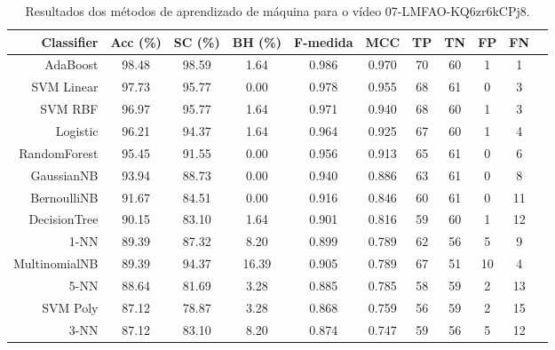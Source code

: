 \begin{table}[!htb]
\centering
\caption{Resultados dos métodos de aprendizado de máquina para o vídeo 07-LMFAO-KQ6zr6kCPj8.}
\label{tab:07-LMFAO-KQ6zr6kCPj8}
\begin{tabular}{r|c|c|c|c|c|c|c|c|c|c}
\hline\hline
Classifier & Acc (\%) & SC (\%) & BH (\%) & F-medida & MCC & TP & TN & FP & FN \\ \hline
AdaBoost & 98.48 & 98.59 & 1.64 & 0.986 & 0.970 & 70 & 60 & 1 & 1 \\ 
SVM Linear & 97.73 & 95.77 & 0.00 & 0.978 & 0.955 & 68 & 61 & 0 & 3 \\ 
SVM RBF & 96.97 & 95.77 & 1.64 & 0.971 & 0.940 & 68 & 60 & 1 & 3 \\ 
Logistic & 96.21 & 94.37 & 1.64 & 0.964 & 0.925 & 67 & 60 & 1 & 4 \\ 
RandomForest & 95.45 & 91.55 & 0.00 & 0.956 & 0.913 & 65 & 61 & 0 & 6 \\ 
GaussianNB & 93.94 & 88.73 & 0.00 & 0.940 & 0.886 & 63 & 61 & 0 & 8 \\ 
BernoulliNB & 91.67 & 84.51 & 0.00 & 0.916 & 0.846 & 60 & 61 & 0 & 11 \\ 
DecisionTree & 90.15 & 83.10 & 1.64 & 0.901 & 0.816 & 59 & 60 & 1 & 12 \\ 
1-NN & 89.39 & 87.32 & 8.20 & 0.899 & 0.789 & 62 & 56 & 5 & 9 \\ 
MultinomialNB & 89.39 & 94.37 & 16.39 & 0.905 & 0.789 & 67 & 51 & 10 & 4 \\ 
5-NN & 88.64 & 81.69 & 3.28 & 0.885 & 0.785 & 58 & 59 & 2 & 13 \\ 
SVM Poly & 87.12 & 78.87 & 3.28 & 0.868 & 0.759 & 56 & 59 & 2 & 15 \\ 
3-NN & 87.12 & 83.10 & 8.20 & 0.874 & 0.747 & 59 & 56 & 5 & 12 \\ 
\hline\hline
\end{tabular}
\end{table}

